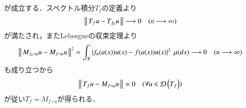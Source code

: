 \begin{prf}
\begin{description}
				が成立する．スペクトル積分$T_f$の定義より
				\begin{align}
					\left\|\, T_f u - T_{f_n} u\, \right\|_{}
					\longrightarrow 0 \quad (n \longrightarrow \infty)
				\end{align}
				が満たされ，またLebesgueの収束定理より
				\begin{align}
					\left\|\, M_{f_n \circ a} u - M_{f \circ a} u\, \right\|_{}^2
					= \int_X \left| f_n(a(x)) u(x) - f(a(x)) u(x) \right|^2\ \mu(dx)
					\longrightarrow 0 
					\quad (n \longrightarrow \infty)
				\end{align}
				も成り立つから
				\begin{align}
					\Norm{T_f u - M_{f \circ a} u}{} = 0
					\quad (\forall u \in \Dom{T_f} )
				\end{align}
				が従い$T_f = M_{f \circ a}$が得られる．
				\QED
		\end{description}
	\end{prf}